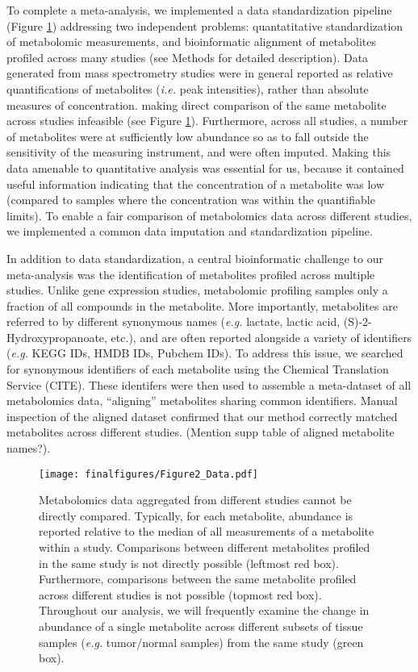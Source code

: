 \documentclass[10pt]{article}
\begin{document}
To complete a meta-analysis, we implemented a data standardization pipeline (Figure \ref{fig:Fig2}) addressing two independent problems: quantatitative standardization of metabolomic measurements, and bioinformatic alignment of metabolites profiled across many studies (see Methods for detailed description). Data generated from mass spectrometry studies were in general reported as relative quantifications of metabolites (\textit{i.e.} peak intensities), rather than absolute measures of concentration. making direct comparison of the same metabolite across studies infeasible (see Figure \ref{fig:Fig2}). Furthermore, across all studies, a number of metabolites were at sufficiently low abundance so as to fall outside the sensitivity of the measuring instrument, and were often imputed. Making this data amenable to quantitative analysis was essential for us, because it contained useful information indicating that the concentration of a metabolite was low (compared to samples where the concentration was within the quantifiable limits). To enable a fair comparison of metabolomics data across different studies, we implemented a common data imputation and standardization pipeline.

In addition to data standardization, a central bioinformatic challenge to our meta-analysis was the identification of metabolites profiled across multiple studies. Unlike gene expression studies, metabolomic profiling samples only a fraction of all compounds in the metabolite. More importantly,  metabolites are referred to by different synonymous names (\textit{e.g.} lactate, lactic acid, (S)-2-Hydroxypropanoate, etc.), and are often reported alongside a variety of identifiers (\textit{e.g.} KEGG IDs, HMDB IDs, Pubchem IDs). To address this issue, we searched for synonymous identifiers of each metabolite using the Chemical Translation Service (CITE). These identifers were then used to assemble a meta-dataset of all metabolomics data, ``aligning'' metabolites sharing common identifiers. Manual inspection of the aligned dataset confirmed that our method correctly matched metabolites across different studies. (Mention supp table of aligned metabolite names?).

\begin{figure}[ht!]
  \centering
     \texttt{[image: finalfigures/Figure2\_Data.pdf]}
  \caption{Metabolomics data aggregated from different studies cannot be directly compared. Typically, for each metabolite, abundance is reported relative to the median of all measurements of a metabolite within a study. Comparisons between different metabolites profiled in the same study is not directly possible (leftmost red box). Furthermore, comparisons between the same metabolite profiled across different studies is not possible	(topmost red box). Throughout our analysis, we will frequently examine the change in abundance of a single metabolite across different subsets of tissue samples (\textit{e.g.} tumor/normal samples) from the same study (green box). }
     \label{fig:Fig2}
\end{figure}
\end{document}
